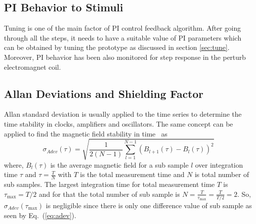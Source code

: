 
\subsection{PI Behavior to Stimuli}
 Tuning is one of the main factor of PI control feedback algorithm. After going through all the steps, it needs to have a suitable value of PI parameters which can be obtained by tuning the prototype as discussed in section \ref{sec:tune}. Moreover, PI behavior has been also monitored for step response in the perturb electromagnet coil.
 
 \subsection{Allan Deviations and Shielding Factor}
 
Allan standard deviation \cite{allan} is usually applied to the time series to determine the time stability in clocks, amplifiers and oscillators. The same concept can be applied to find the magnetic field stability in time~\cite{bea} as
\begin{equation}\label{eq:adev}
    \sigma_{Adev} (\tau)=\sqrt{\frac{1}{2(N-1)}\sum_{l=1}^{N-1} \left(B_{l+1}(\tau)-B_l(\tau)\right)^2}
\end{equation}
where, $B_l(\tau)$ is the average magnetic field for a sub sample $l$ over integration time $\tau$ and $\tau = \frac{T}{N}$ with $T$ is the total measurement time and $N$ is total number of sub samples. The largest integration time for total measurement time $T$ is $\tau_{\text{max}}=T/2$ and for that the total number of sub sample is $N = \frac{T}{\tau_{\text{max}}}=\frac{T}{T/2}=2$. So, $\sigma_{Adev}(\tau_{\text{max}})$ is negligible since there is only one difference value of sub sample as seen by Eq.~(\ref{eq:adev}).

